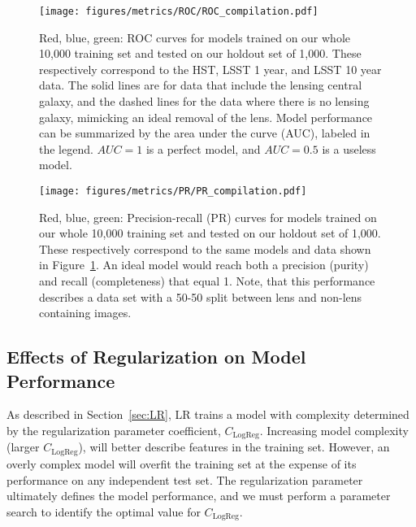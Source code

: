 \documentclass{emulateapj}
\begin{document}
\begin{figure}[t]\label{fig:ROCcompilation}
\begin{center}
\texttt{[image: figures/metrics/ROC/ROC\_compilation.pdf]}
\caption{Red, blue, green: ROC curves for models trained on our whole
  10,000 training set and tested on our holdout set of 1,000.  These
  respectively correspond to the HST, LSST 1 year, and LSST 10 year
  data.  The solid lines are for data that include the lensing central
  galaxy, and the dashed lines for the data where there is no lensing
  galaxy, mimicking an ideal removal of the lens.  Model performance
  can be summarized by the area under the curve (AUC), labeled in the
  legend. $AUC=1$ is a perfect model, and $AUC=0.5$ is a useless
  model.}
\end{center}
\end{figure}
\begin{figure}[t]\label{fig:PRcompilation}
\begin{center}
\texttt{[image: figures/metrics/PR/PR\_compilation.pdf]}
\caption{Red, blue, green: Precision-recall (PR) curves for models
  trained on our whole 10,000 training set and tested on our holdout
  set of 1,000.  These respectively correspond to the same models and
  data shown in Figure~\ref{fig:ROCcompilation}.  An ideal model would
  reach both a precision (purity) and recall (completeness) that equal
  1.  Note, that this performance describes a data set with a 50-50
  split between lens and non-lens containing images.}
\end{center}
\end{figure}

\subsection{Effects of Regularization on Model Performance}\label{sec:regularization}

As described in Section~\ref{sec:LR}, LR trains a model with
complexity determined by the regularization parameter coefficient,
$C_\text{LogReg}$.  Increasing model complexity (larger
$C_\text{LogReg}$), will better describe features in the training set.
However, an overly complex model will overfit the training set at the
expense of its performance on any independent test set.  The
regularization parameter ultimately defines the model performance, and
we must perform a parameter search to identify the optimal value for
$C_\text{LogReg}$.
\end{document}
